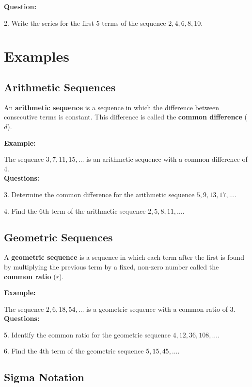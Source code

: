 \documentclass[12pt]{article}
\begin{document}
\textbf{Question:}

2. Write the series for the first 5 terms of the sequence \(2, 4, 6, 8, 10\).

\section*{Examples}

\subsection*{Arithmetic Sequences}

An \textbf{arithmetic sequence} is a sequence in which the difference between consecutive terms is constant. This difference is called the \textbf{common difference} (\(d\)).

\textbf{Example:}

The sequence \(3, 7, 11, 15, \ldots\) is an arithmetic sequence with a common difference of 4.\\

\textbf{Questions:}

3. Determine the common difference for the arithmetic sequence \(5, 9, 13, 17, \ldots\).

4. Find the 6th term of the arithmetic sequence \(2, 5, 8, 11, \ldots\).

\subsection*{Geometric Sequences}

A \textbf{geometric sequence} is a sequence in which each term after the first is found by multiplying the previous term by a fixed, non-zero number called the \textbf{common ratio} (\(r\)).

\textbf{Example:}

The sequence \(2, 6, 18, 54, \ldots\) is a geometric sequence with a common ratio of 3.\\

\textbf{Questions:}

5. Identify the common ratio for the geometric sequence \(4, 12, 36, 108, \ldots\).

6. Find the 4th term of the geometric sequence \(5, 15, 45, \ldots\).

\newpage

\subsection*{Sigma Notation}
\end{document}
